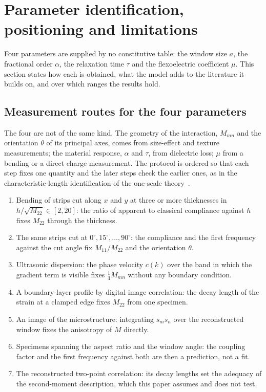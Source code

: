\FloatBarrier
\section{Parameter identification, positioning and limitations}
\label{sec:calibration}

Four parameters are supplied by no constitutive table: the window size $a$,
the fractional order $\alpha$, the relaxation time $\tau$ and the flexoelectric
coefficient $\mu$. This section states how each is obtained, what the model adds
to the literature it builds on, and over which ranges the results hold.

\FloatBarrier
\subsection{Measurement routes for the four parameters}
\label{sec:calib_a_mu}

The four are not of the same kind. The geometry of the interaction, $M_{mn}$
and the orientation $\theta$ of its principal axes, comes from size-effect and
texture measurements; the material response, $\alpha$ and $\tau$, from
dielectric loss; $\mu$ from a bending or a direct charge measurement. The
protocol is ordered so that each step fixes one quantity and the later steps
check the earlier ones, as in the characteristic-length identification of the
one-scale theory~\cite{fem1}.

\begin{enumerate}
\item Bending of strips cut along $x$ and $y$ at three or more thicknesses in
  $h/\sqrt{M_{22}}\in[2,20]$: the ratio of apparent to classical compliance
  against $h$ fixes $M_{22}$ through the thickness.
\item The same strips cut at $0^\circ,15^\circ,\dots,90^\circ$: the compliance
  and the first frequency against the cut angle fix $M_{11}/M_{22}$ and the
  orientation $\theta$.
\item Ultrasonic dispersion: the phase velocity $c(k)$ over the band in which
  the gradient term is visible fixes $\tfrac14 M_{mn}$ without any boundary
  condition.
\item A boundary-layer profile by digital image correlation: the decay length
  of the strain at a clamped edge fixes $M_{22}$ from one specimen.
\item An image of the microstructure: integrating $s_ms_n$ over the
  reconstructed window fixes the anisotropy of $M$ directly.
\item Specimens spanning the aspect ratio and the window angle: the coupling
  factor and the first frequency against both are then a prediction, not a fit.
\item The reconstructed two-point correlation: its decay lengths set the
  adequacy of the second-moment description, which this paper assumes and does
  not test.
\end{enumerate}

